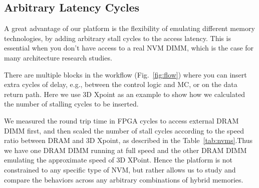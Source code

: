 \documentclass[conference]{IEEEtran}
\begin{document}
\subsection{Arbitrary Latency Cycles}
\label{mimic}
A great advantage of our platform is the flexibility of emulating different memory technologies, by adding arbitrary stall cycles to the access latency. This is essential when you don't have access to a real NVM DIMM, which is the case for many architecture research studies.\par
There are multiple blocks in the workflow (Fig.~\ref{fig:flow}) where you can insert extra cycles of delay, e.g., between the control logic and MC, or on the data return path. Here we use 3D Xpoint as an example to show how we calculated the number of stalling cycles to be inserted.\par 
We measured the round trip time in FPGA cycles to access external DRAM
DIMM first, and then scaled the number of stall cycles according to
the speed ratio between DRAM and 3D Xpoint, as described
in the Table~\ref{tab:nvms}.Thus we have one DRAM DIMM running at
full speed and the other DRAM DIMM emulating the approximate speed of 3D XPoint. Hence the
platform is not constrained to any specific type of NVM, but rather
allows us to study and compare the behaviors across any arbitrary
combinations of hybrid memories. 
\end{document}
